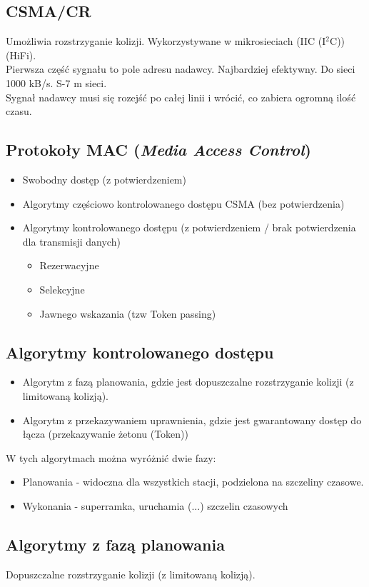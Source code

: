 \documentclass[a4paper,twoside]{article}
\begin{document}
	\subsection{CSMA/CR}
		Umożliwia rozstrzyganie kolizji. Wykorzystywane w mikrosieciach (IIC (I$ ^2 $C)) (HiFi).\\
		Pierwsza część sygnału to pole adresu nadawcy. Najbardziej efektywny. Do sieci 1000 kB/s. S-7 m sieci.\\
		Sygnał nadawcy musi się rozejść po całej linii i wrócić, co zabiera ogromną ilość czasu.
	\subsection{Protokoły MAC (\emph{Media Access Control})}
		\begin{itemize}
			\item Swobodny dostęp (z potwierdzeniem)
			\item Algorytmy częściowo kontrolowanego dostępu CSMA (bez potwierdzenia)
			\item Algorytmy kontrolowanego dostępu (z potwierdzeniem / brak potwierdzenia dla transmisji danych)
			\begin{itemize}
				\item Rezerwacyjne
				\item Selekcyjne
				\item Jawnego wskazania (tzw Token passing)
			\end{itemize}
		\end{itemize}
	\subsection{Algorytmy kontrolowanego dostępu}
		\begin{itemize}
			\item Algorytm z fazą planowania, gdzie jest dopuszczalne rozstrzyganie kolizji (z limitowaną kolizją).
			\item Algorytm z przekazywaniem uprawnienia, gdzie jest gwarantowany dostęp do łącza (przekazywanie żetonu (Token))
		\end{itemize}
		W tych algorytmach można wyróżnić dwie fazy:
		\begin{itemize}
			\item Planowania - widoczna dla wszystkich stacji, podzielona na szczeliny czasowe.
			\item Wykonania - superramka, uruchamia (...) szczelin czasowych
		\end{itemize}
	\subsection{Algorytmy z fazą planowania}
		Dopuszczalne rozstrzyganie kolizji (z limitowaną kolizją).
\end{document}
